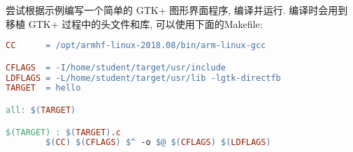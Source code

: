 尝试根据示例编写一个简单的 GTK+ 图形界面程序, 编译并运行. 编译时会用到
移植 GTK+ 过程中的头文件和库, 可以使用下面的Makefile:

\begin{lstlisting}[language=make]
CC      = /opt/armhf-linux-2018.08/bin/arm-linux-gcc

CFLAGS  = -I/home/student/target/usr/include
LDFLAGS = -L/home/student/target/usr/lib -lgtk-directfb
TARGET  = hello

all: $(TARGET)

$(TARGET) : $(TARGET).c
        $(CC) $(CFLAGS) $^ -o $@ $(CFLAGS) $(LDFLAGS)

\end{lstlisting}
